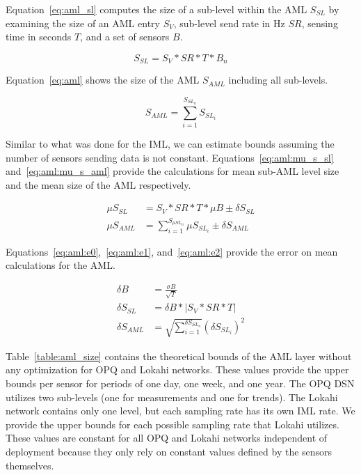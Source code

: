 Equation~\ref{eq:aml_sl} computes the size of a sub-level within the AML $S_{SL}$ by examining the size of an AML entry $S_{V}$, sub-level send rate in Hz $SR$, sensing time in seconds $T$, and a set of sensors $B$.

\begin{equation}\label{eq:aml_sl}
	S_{SL} = S_{V} * SR * T * B_{n}
\end{equation}

Equation~\ref{eq:aml} shows the size of the AML $S_{AML}$ including all sub-levels.

\begin{equation}\label{eq:aml}
	S_{AML} = \sum_{i=1}^{S_{SL_{n}}} S_{SL_{i}}
\end{equation}

Similar to what was done for the IML, we can estimate bounds assuming the number of sensors sending data is not constant. Equations~\ref{eq:aml:mu_s_sl} and~\ref{eq:aml:mu_s_aml} provide the calculations for mean sub-AML level size and the mean size of the AML respectively.

\begin{align}
	\mu S_{SL} &= S_{V} * SR * T * \mu B \pm \delta S_{SL} \label{eq:aml:mu_s_sl} \\
	\mu S_{AML} &= \sum_{i=1}^{S_{\mu SL_{n}}} \mu S_{SL_{i}} \pm \delta S_{AML} \label{eq:aml:mu_s_aml}
\end{align}

Equations~\ref{eq:aml:e0},~\ref{eq:aml:e1}, and~\ref{eq:aml:e2} provide the error on mean calculations for the AML\@.

\begin{align}
	\delta B &= \frac{\sigma B}{\sqrt{T}} \label{eq:aml:e0} \\
	\delta S_{SL} &= \delta B * |S_{V} * SR * T| \label{eq:aml:e1} \\
	\delta S_{AML} &= \sqrt{\sum_{i=1}^{\delta S_{SL_{n}}}} (\delta S_{SL_{i}}) ^ 2  \label{eq:aml:e2}
\end{align}

Table~\ref{table:aml_size} contains the theoretical bounds of the AML layer without any optimization for OPQ and Lokahi networks. These values provide the upper bounds per sensor for periods of one day, one week, and one year. The OPQ DSN utilizes two sub-levels (one for measurements and one for trends). The Lokahi network contains only one level, but each sampling rate has its own IML rate. We provide the upper bounds for each possible sampling rate that Lokahi utilizes. These values are constant for all OPQ and Lokahi networks independent of deployment because they only rely on constant values defined by the sensors themselves.

